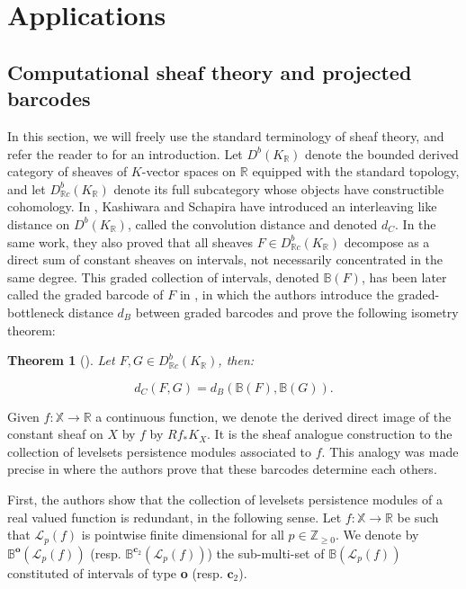 \documentclass[11pt]{article}
\newtheorem{theorem}{Theorem}[section]
\theoremstyle{remark}
\newcommand{\Z}{\mathbb{Z}}
\newcommand{\R}{\mathbb{R}}
\begin{document}
\section{Applications}

\subsection{Computational sheaf theory and projected barcodes}




In this section, we will freely use the standard terminology of sheaf theory, and refer the reader to \cite{KS90} for an introduction. Let $D^b(K_\R)$ denote the bounded derived category of sheaves of $K$-vector spaces on $\R$ equipped with the standard topology, and let $D^b_{\R c}(K_\R)$ denote its full subcategory whose objects have constructible cohomology. In \cite{KS18}, Kashiwara and Schapira have introduced an interleaving like distance on  $D^b(K_\R)$, called the convolution distance and denoted $d_C$. In the same work, they also proved that  all sheaves $F \in D^b_{\R c}(K_\R)$ decompose as a direct sum of constant sheaves on intervals, not necessarily concentrated in the same degree. This graded collection of intervals, denoted $\mathbb{B}(F)$, has been  later called the graded barcode of $F$ in \cite[Definition 2.13]{BG18}, in which the authors introduce the graded-bottleneck distance $d_B$ between graded barcodes and prove the following isometry theorem:

\begin{theorem}[\cite{BG18}]
Let $F,G\in D^b_{\R c}(K_\R)$, then:

\[d_C(F,G) = d_B(\mathbb{B}(F),\mathbb{B}(G)).\]
\end{theorem}

Given $f : \mathbb{X} \longrightarrow \R$ a continuous function, we denote the derived direct image of the constant sheaf on $X$ by $f$ by $R f_\ast K_X$. It is the sheaf analogue construction to the collection of levelsets persistence modules associated to $f$. This analogy was made precise in \cite{BGO19} where the authors prove that these barcodes determine each others.


First, the authors show that the collection of levelsets persistence modules of a real valued function is redundant, in the following sense. Let $f : \mathbb{X} \to \R$ be such that $\mathcal{L}_p(f)$ is pointwise finite dimensional for all $p \in \Z_{\geq 0}$. We denote by $\mathbb{B}^\textbf{o}(\mathcal{L}_p(f))$ (resp. $\mathbb{B}^{\textbf{c}_2}(\mathcal{L}_p(f))$) the sub-multi-set of $\mathbb{B}(\mathcal{L}_p(f))$ constituted of intervals of type \textbf{o} (resp. $\textbf{c}_2$).
\end{document}
